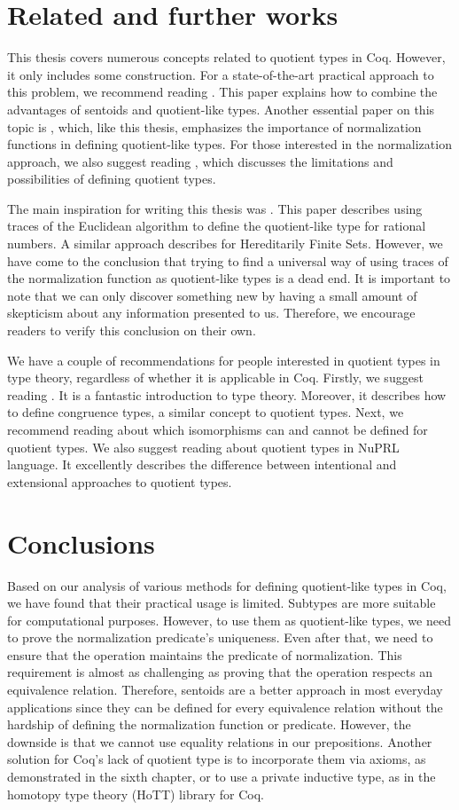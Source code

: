 \section{Related and further works}
This thesis covers numerous concepts related to quotient types in Coq. However, it only includes some construction. For a state-of-the-art practical approach to this problem, we recommend reading \cite{PragmaticQT}. This paper explains how to combine the advantages of sentoids and quotient-like types. Another essential paper on this topic is \cite{NormalizedTypes}, which, like this thesis, emphasizes the importance of normalization functions in defining quotient-like types. For those interested in the normalization approach, we also suggest reading \cite{DefinableQuotients}, which discusses the limitations and possibilities of defining quotient types.

The main inspiration for writing this thesis was \cite{Qplus}. This paper describes using traces of the Euclidean algorithm to define the quotient-like type for rational numbers. A similar approach describes \cite{HereditarilyFS} for Hereditarily Finite Sets. However, we have come to the conclusion that trying to find a universal way of using traces of the normalization function as quotient-like types is a dead end. It is important to note that we can only discover something new by having a small amount of skepticism about any information presented to us. Therefore, we encourage readers to verify this conclusion on their own.

We have a couple of recommendations for people interested in quotient types in type theory, regardless of whether it is applicable in Coq. Firstly, we suggest reading \cite{DIY_TT}. It is a fantastic introduction to type theory. Moreover, it describes how to define congruence types, a similar concept to quotient types. Next, we recommend reading \cite{Quot_izo} about which isomorphisms can and cannot be defined for quotient types. We also suggest reading \cite{NuPRL_quot} about quotient types in NuPRL language. It excellently describes the difference between intentional and extensional approaches to quotient types.
\section{Conclusions}
Based on our analysis of various methods for defining quotient-like types in Coq, we have found that their practical usage is limited. Subtypes are more suitable for computational purposes. However, to use them as quotient-like types, we need to prove the normalization predicate's uniqueness. Even after that, we need to ensure that the operation maintains the predicate of normalization. This requirement is almost as challenging as proving that the operation respects an equivalence relation. Therefore, sentoids are a better approach in most everyday applications since they can be defined for every equivalence relation without the hardship of defining the normalization function or predicate. However, the downside is that we cannot use equality relations in our prepositions. Another solution for Coq's lack of quotient type is to incorporate them via axioms, as demonstrated in the sixth chapter, or to use a private inductive type, as in the homotopy type theory (HoTT) library for Coq.